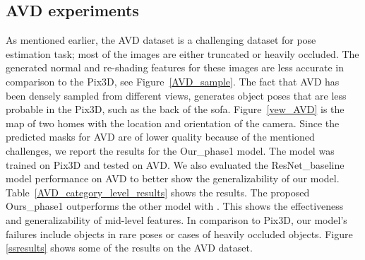 \documentclass[letterpaper, 10 pt, conference]{ieeeconf}  \pdfoutput=1
\begin{document}
\begin{table}
\centering
{}
\caption{The comparison of our model with the Pix3D model. Results are only for the chair category for different number of bins.}
\label{compare_with_pix3d}
\end{table}

\begin{table}
\centering
{}
\caption{The average accuracy of the azimuth and elevation for the different number of bins.}
\label{difrent_bins}
\end{table}




\subsection{AVD experiments}
As mentioned earlier, the AVD dataset is a challenging dataset for pose estimation task; most of the images are either truncated or heavily occluded. The generated normal and re-shading features for these images are less accurate in comparison to the Pix3D, see Figure~\ref{AVD_sample}. The fact that AVD has been densely sampled from different views, generates object poses that are less probable in the Pix3D, such as the back of the sofa. Figure~\ref{vew_AVD} is the map of two homes with the location and orientation of the camera. Since the predicted masks for AVD are of lower quality because of the mentioned challenges, we report the results for the Our\_phase1 model. The model was trained on Pix3D and tested on AVD. We also evaluated the ResNet\_baseline model performance on AVD to better show the generalizability of our model. Table~\ref{AVD_category_level_results} shows the results. The proposed Ours\_phase1 outperforms the other model with . This shows the effectiveness and generalizability of mid-level features. In comparison to Pix3D, our model's failures include objects in rare poses or cases of heavily occluded objects. Figure \ref{ssresults} shows some of the results on the AVD dataset.
\end{document}
